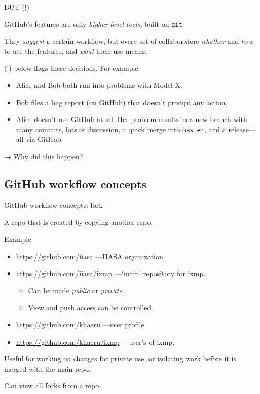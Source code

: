 \documentclass[12pt,aspectratio=169]{beamer}
\begin{document}
\begin{frame}{BUT (!)}

GitHub's features are only \emph{higher-level tools}, built on \texttt{git}.

\bigskip
They \emph{suggest} a certain workflow, but every set of collaborators  \emph{whether} and \emph{how} to use the features, and \emph{what} their use means.

\bigskip
\alert{(!)} below flags these decisions.
For example:

\begin{itemize}
  \item Alice and Bob both run into problems with Model X.
  \item Bob files a bug report (on GitHub) that doesn't prompt any action.
  \item Alice doesn't use GitHub at all. Her problem results in a new branch with many commits, lots of discussion, a quick merge into \texttt{master}, and a release—all via GitHub.
\end{itemize}

→ Why did this happen?

\end{frame}

\subsection{GitHub workflow concepts}
\begin{frame}{GitHub workflow concepts: fork}

A repo that is created by copying another repo.

\bigskip
Example:
\begin{itemize}
  \item \url{https://github.com/iiasa} —IIASA organization.
  \item \url{https://github.com/iiasa/ixmp} —‘main’ repository for ixmp.
    \begin{itemize}
      \item Can be made \emph{public} or \emph{private}.
      \item View and push access can be controlled.
    \end{itemize}
  \item \url{https://github.com/khaeru} —user profile.
  \item \url{https://github.com/khaeru/ixmp} ­—user's  of ixmp.
\end{itemize}

\bigskip
Useful for working on changes for private use, or isolating work before it is merged with the main repo.

Can view all forks from a repo.

\end{frame}
\end{document}
